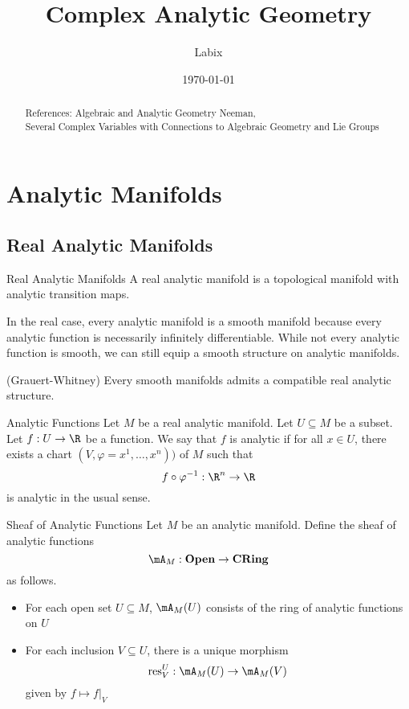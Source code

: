 \documentclass[a4paper]{article}
\title{Complex Analytic Geometry}
\author{Labix}
\date{\today}
\begin{document}
\maketitle
\begin{abstract}
References: Algebraic and Analytic Geometry Neeman, \\
Several Complex Variables with Connections to Algebraic Geometry and Lie Groups
\end{abstract}
\pagebreak
\tableofcontents

\pagebreak
\section{Analytic Manifolds}
\subsection{Real Analytic Manifolds}
\begin{defn}{Real Analytic Manifolds}{} A real analytic manifold is a topological manifold with analytic transition maps. 
\end{defn}

In the real case, every analytic manifold is a smooth manifold because every analytic function is necessarily infinitely differentiable. While not every analytic function is smooth, we can still equip a smooth structure on analytic manifolds. 

\begin{thm}{(Grauert-Whitney)}{} Every smooth manifolds admits a compatible real analytic structure. 
\end{thm}

\begin{defn}{Analytic Functions}{} Let $M$ be a real analytic manifold. Let $U\subseteq M$ be a subset. Let $f:U\to\R$ be a function. We say that $f$ is analytic if for all $x\in U$, there exists a chart $(V,\varphi=x^1,\dots,x^n))$ of $M$ such that $$f\circ\varphi^{-1}:\R^n\to\R$$ is analytic in the usual sense. 
\end{defn}

\begin{defn}{Sheaf of Analytic Functions}{} Let $M$ be an analytic manifold. Define the sheaf of analytic functions $$\mA_M:\bold{Open}\to\bold{CRing}$$ as follows. 
\begin{itemize}
\item For each open set $U\subseteq M$, $\mA_M(U)$ consists of the ring of analytic functions on $U$
\item For each inclusion $V\subseteq U$, there is a unique morphism $$\text{res}_V^U:\mA_M(U)\to\mA_M(V)$$ given by $f\mapsto f|_V$
\end{itemize}
\end{defn}
\end{document}

